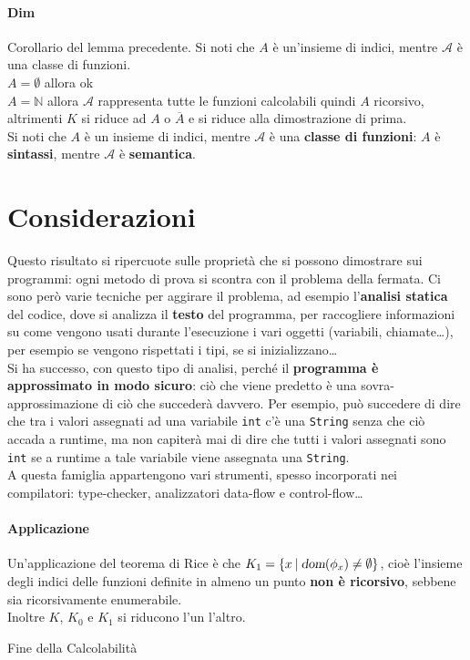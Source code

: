\documentclass[10pt]{book}
\begin{document}
\paragraph{Dim} Corollario del lemma precedente. Si noti che $A$ è un'insieme di indici, mentre $\mathscr{A}$ è una classe di funzioni.\\
$A = \emptyset$ allora ok\\
$A = \mathbb{N}$ allora $\mathscr{A}$ rappresenta tutte le funzioni calcolabili quindi $A$ ricorsivo, altrimenti $K$ si riduce ad $A$ o $\overline{A}$ e si riduce alla dimostrazione di prima.\\
Si noti che $A$ è un insieme di indici, mentre $\mathscr{A}$ è una \textbf{classe di funzioni}: $A$ è \textbf{sintassi}, mentre $\mathscr{A}$ è \textbf{semantica}.
\section{Considerazioni}
Questo risultato si ripercuote sulle proprietà che si possono dimostrare sui programmi: ogni metodo di prova si scontra con il problema della fermata. Ci sono però varie tecniche per aggirare il problema, ad esempio l'\textbf{analisi statica} del codice, dove si analizza il \textbf{testo} del programma, per raccogliere informazioni su come vengono usati durante l'esecuzione i vari oggetti (variabili, chiamate\ldots), per esempio se vengono rispettati i tipi, se si inizializzano\ldots\\
Si ha successo, con questo tipo di analisi, perché il \textbf{programma è approssimato in modo sicuro}: ciò che viene predetto è una sovra-approssimazione di ciò che succederà davvero. Per esempio, può succedere di dire che tra i valori assegnati ad una variabile \texttt{int} c'è una \texttt{String} senza che ciò accada a runtime, ma non capiterà mai di dire che tutti i valori assegnati sono \texttt{int} se a runtime a tale variabile viene assegnata una \texttt{String}.\\
A questa famiglia appartengono vari strumenti, spesso incorporati nei compilatori: type-checker, analizzatori data-flow e control-flow\ldots
\paragraph{Applicazione} Un'applicazione del teorema di Rice è che $K_1 = \{x\: |\: \textsl{dom}(\phi_x) \neq \emptyset\}$, cioè l'insieme degli indici delle funzioni definite in almeno un punto \textbf{non è ricorsivo}, sebbene sia ricorsivamente enumerabile.\\
Inoltre $K$, $K_0$ e $K_1$ si riducono l'un l'altro.
\begin{center}
Fine della Calcolabilità
\end{center}
\end{document}
